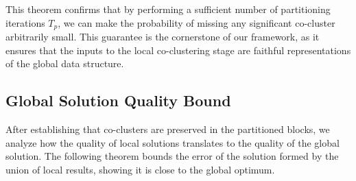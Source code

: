 \documentclass[journal]{IEEEtran}
\theoremstyle{definition}
\theoremstyle{remark} %
\begin{document}
{This theorem confirms that by performing a sufficient number of partitioning iterations $T_p$, we can make the probability of missing any significant co-cluster arbitrarily small. This guarantee is the cornerstone of our framework, as it ensures that the inputs to the local co-clustering stage are faithful representations of the global data structure.

\subsection{Global Solution Quality Bound}
\label{subsec:global-solution-quality-bound}
After establishing that co-clusters are preserved in the partitioned blocks, we analyze how the quality of local solutions translates to the quality of the global solution. The following theorem bounds the error of the solution formed by the union of local results, showing it is close to the global optimum.

}
\end{document}
